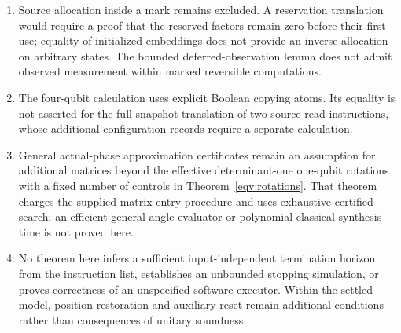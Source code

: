 \begin{enumerate}
\item Source allocation inside a mark remains excluded. A reservation translation would require a proof that the reserved factors remain zero before their first use; equality of initialized embeddings does not provide an inverse allocation on arbitrary states. The bounded deferred-observation lemma does not admit observed measurement within marked reversible computations.
\item The four-qubit calculation uses explicit Boolean copying atoms. Its equality is not asserted for the full-snapshot translation of two source read instructions, whose additional configuration records require a separate calculation.
\item General actual-phase approximation certificates remain an assumption for additional matrices beyond the effective determinant-one one-qubit rotations with a fixed number of controls in Theorem~\ref{eqv:rotations}. That theorem charges the supplied matrix-entry procedure and uses exhaustive certified search; an efficient general angle evaluator or polynomial classical synthesis time is not proved here.
\item No theorem here infers a sufficient input-independent termination horizon from the instruction list, establishes an unbounded stopping simulation, or proves correctness of an unspecified software executor. Within the settled model, position restoration and auxiliary reset remain additional conditions rather than consequences of unitary soundness.
\end{enumerate}
